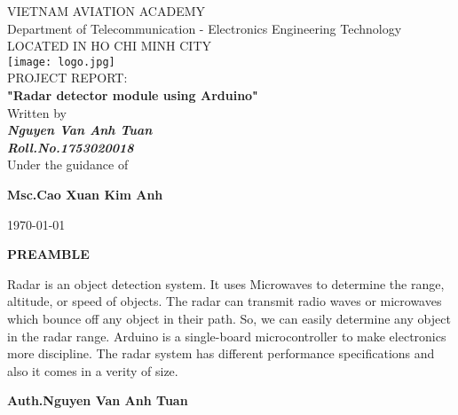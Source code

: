 \documentclass[13pt,a4paper]{report}
\begin{document}
    \begin{titlepage}
        \centering
        
        \LARGE{\textsc{VIETNAM AVIATION ACADEMY}}\\
        \vspace{3mm}
        \normalsize{Department of Telecommunication - Electronics Engineering Technology} \\
        \vspace{3mm}
        \large{LOCATED IN HO CHI MINH CITY} \\
        \vspace{3mm}
        \texttt{[image: logo.jpg]} \\
        \vspace{3mm}
        \normalsize{PROJECT REPORT: } \\ 
        \vspace{15mm}
        \huge{\textbf{"Radar detector module using Arduino"}} \\
        \vspace{20mm}
        \normalsize{Written by} \\
        \vspace{3mm}
        \large{\textbf{\textit{Nguyen Van Anh Tuan}}} \\
        \vspace{3mm}
        \textbf{{\large{\textit{Roll.No.1753020018}}}} \\
        \vspace{15mm}
        \large{Under the guidance of} \\ 
        \vspace{10mm}
        \centerline{\textbf{\large{Msc.Cao Xuan Kim Anh}}}
        \vspace{6cm}
        \centerline{\today}
    \end{titlepage}

    \newpage
    \centering
    \centerline{\textbf{\huge{PREAMBLE}}}
    \vspace{10mm}
    \begin{flushleft}
        Radar is an object detection system. It uses Microwaves to determine the range, 
        altitude, or speed of objects. The radar can transmit radio waves or microwaves 
        which bounce off any object in their path. So, we can easily determine any object 
        in the radar range. Arduino is a single-board microcontroller to make electronics 
        more discipline. The radar system has different performance specifications and also 
        it comes in a verity of size.
    \end{flushleft}
    \begin{flushright}
        \textbf{Auth.Nguyen Van Anh Tuan}
    \end{flushright}
    \thispagestyle{plain}
\end{document}
